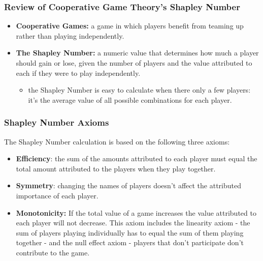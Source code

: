 
\begin{frame}\frametitle{Review of Cooperative Game Theory's Shapley Number}
\begin{itemize}
	\item \textbf{Cooperative Games:} a game in which players benefit from teaming up rather than playing independently. 
	\bigskip
	\item \textbf{The Shapley Number:} a numeric value that determines how much a player should gain or lose, given the number of players and the value attributed to each if they were to play independently. 	\begin{itemize}
		\bigskip
		\item the Shapley Number is easy to calculate when there only a few players: it's the average value of all possible combinations for each player. 
	\end{itemize}
\end{itemize}
\end{frame}


\begin{frame}\frametitle{Shapley Number Axioms}
The Shapley Number calculation is based on the following three axioms:
\begin{itemize}
	\bigskip
	\item \textbf{Efficiency}: the sum of the amounts attributed to each player must equal the total amount attributed to the players when they play together.
	\bigskip
	\item \textbf{Symmetry}: changing the names of players doesn't affect the attributed importance of each player.
	\bigskip
	\item \textbf{Monotonicity:} If the total value of a game increases the value attributed to each player will not decrease. This axiom includes the linearity axiom - the sum of players playing individually has to equal the sum of them playing together - and the null effect axiom - players that don't participate don't contribute to the game. 
\end{itemize}

\end{frame}


